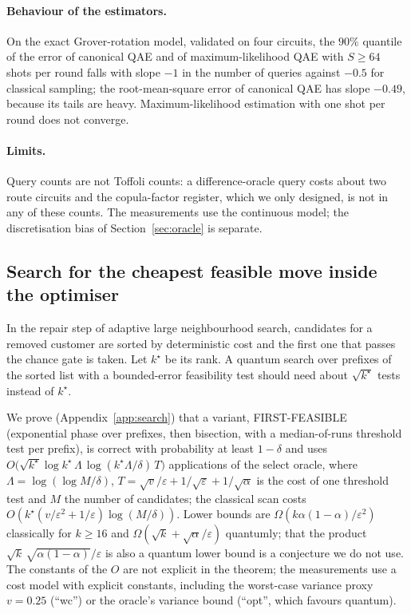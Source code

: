 \documentclass[pdflatex,sn-mathphys-num]{sn-jnl}
\theoremstyle{thmstyleone}
\theoremstyle{thmstyletwo}
\begin{document}
\paragraph{Behaviour of the estimators.} On the exact Grover-rotation model, validated on four circuits, the $90\%$ quantile of the error of canonical QAE and of maximum-likelihood QAE with $S\ge64$ shots per round falls with slope $-1$ in the number of queries against $-0.5$ for classical sampling; the root-mean-square error of canonical QAE has slope $-0.49$, because its tails are heavy. Maximum-likelihood estimation with one shot per round does not converge.

\paragraph{Limits.} Query counts are not Toffoli counts: a difference-oracle query costs about two route circuits and the copula-factor register, which we only designed, is not in any of these counts. The measurements use the continuous model; the discretisation bias of Section~\ref{sec:oracle} is separate.

\subsection{Search for the cheapest feasible move inside the optimiser}\label{sec:search}
In the repair step of adaptive large neighbourhood search, candidates for a removed customer are sorted by deterministic cost and the first one that passes the chance gate is taken. Let $k^\star$ be its rank. A quantum search over prefixes of the sorted list with a bounded-error feasibility test should need about $\sqrt{k^\star}$ tests instead of $k^\star$.

We prove (Appendix~\ref{app:search}) that a variant, FIRST-FEASIBLE (exponential phase over prefixes, then bisection, with a median-of-runs threshold test per prefix), is correct with probability at least $1-\delta$ and uses $O\bigl(\sqrt{k^\star}\log k^\star\,\Lambda\,\log(k^\star\Lambda/\delta)\,T\bigr)$ applications of the select oracle, where $\Lambda=\log(\log M/\delta)$, $T=\sqrt{v}/\varepsilon+1/\sqrt{\varepsilon}+1/\sqrt{\alpha}$ is the cost of one threshold test and $M$ the number of candidates; the classical scan costs $O(k^\star(v/\varepsilon^2+1/\varepsilon)\log(M/\delta))$. Lower bounds are $\Omega(k\alpha(1-\alpha)/\varepsilon^2)$ classically for $k\ge16$ and $\Omega(\sqrt k+\sqrt\alpha/\varepsilon)$ quantumly; that the product $\sqrt k\,\sqrt{\alpha(1-\alpha)}/\varepsilon$ is also a quantum lower bound is a conjecture we do not use. The constants of the $O$ are not explicit in the theorem; the measurements use a cost model with explicit constants, including the worst-case variance proxy $v=0.25$ (``wc'') or the oracle's variance bound (``opt'', which favours quantum).
\end{document}
